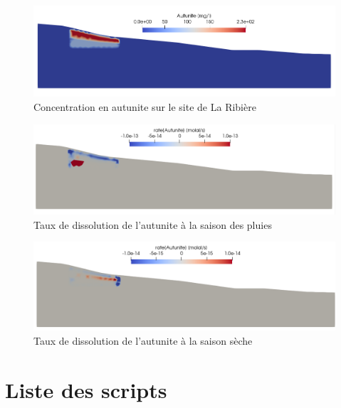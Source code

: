 \documentclass{article}
\makeatletter
\renewcommand\listoffigures{%
    \section{\listfigurename}%
      \@mkboth{\MakeUppercase\listfigurename}%
              {\MakeUppercase\listfigurename}%
    \@starttoc{lof}%
    }
\renewcommand\listoftables{%
    \section{\listtablename}%
      \@mkboth{\MakeUppercase\listtablename}%
              {\MakeUppercase\listtablename}%
    \@starttoc{lot}%
    }
\makeatother
\begin{document}
\begin{figure}[H]
    \centering
    \includegraphics[width=\linewidth]{LJ-Autunite-concentration.PNG}
    \caption{Concentration en autunite sur le site de La Ribière }
    \label{fig:concentration_autunite}
\end{figure}
\begin{figure}[H]
    \centering
    \includegraphics[width=\linewidth]{LJ-rate-Autunite-pluies.png}
    \caption{Taux de dissolution de l'autunite à la saison des pluies}
    \label{fig:rate_autunite_pluies}
\end{figure}

\begin{figure}[H]
    \centering
    \includegraphics[width=\linewidth]{LJ-rate-Autunite-saison-seche.PNG}
    \caption{Taux de dissolution de l'autunite à la saison sèche}
    \label{fig:rate_autunite_seche}
\end{figure}
\newpage

\newpage
\listoffigures
\newpage
\listoftables
\newpage
\section{Liste des scripts}
\lstlistoflistings
\stopcontents[appendices]
\end{document}
